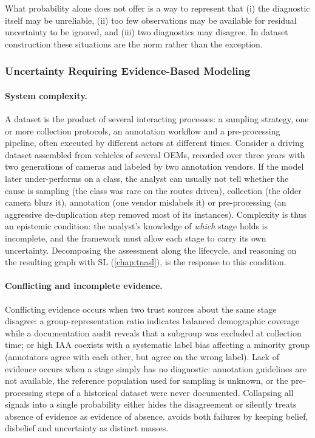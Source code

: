 What probability alone does not offer is a way to represent that (i) the diagnostic itself may be unreliable, (ii) too few observations may be available for residual uncertainty to be ignored, and (iii) two diagnostics may disagree. In dataset construction these situations are the norm rather than the exception.

\subsubsection{Uncertainty Requiring Evidence-Based Modeling}
\label{sec:dataset-trust:uncertainty:evidence}

\paragraph{System complexity.}
A dataset is the product of several interacting processes: a sampling strategy, one or more collection protocols, an annotation workflow and a pre-processing pipeline, often executed by different actors at different times. Consider a driving dataset assembled from vehicles of several \acp{OEM}, recorded over three years with two generations of cameras and labeled by two annotation vendors. If the model later under-performs on a class, the analyst can usually not tell whether the cause is sampling (the class was rare on the routes driven), collection (the older camera blurs it), annotation (one vendor mislabels it) or pre-processing (an aggressive de-duplication step removed most of its instances). Complexity is thus an epistemic condition: the analyst's knowledge of \emph{which} stage holds is incomplete, and the framework must allow each stage to carry its own uncertainty. Decomposing the assessment along the lifecycle, and reasoning on the resulting graph with \ac{SL} (\cref{chap:tnasl}), is the response to this condition.

\paragraph{Conflicting and incomplete evidence.}
Conflicting evidence occurs when two trust sources about the same stage disagree: a group-representation ratio indicates balanced demographic coverage while a documentation audit reveals that a subgroup was excluded at collection time; or high \ac{IAA} coexists with a systematic label bias affecting a minority group (annotators agree with each other, but agree on the wrong label). Lack of evidence occurs when a stage simply has no diagnostic: annotation guidelines are not available, the reference population used for sampling is unknown, or the pre-processing steps of a historical dataset were never documented. Collapsing all signals into a single probability either hides the disagreement or silently treats absence of evidence as evidence of absence.  avoids both failures by keeping belief, disbelief and uncertainty as distinct masses.

